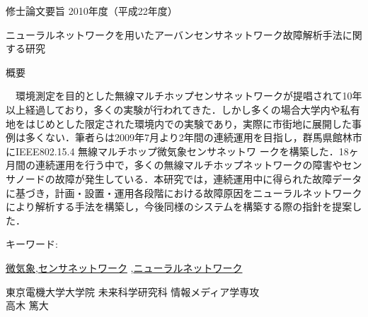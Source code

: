 \newpage
\pagestyle{plain}
\begin{center}
\LARGE{修士論文要旨 \hspace{10mm} 2010年度（平成22年度）}\\

\vspace{10mm}

\LARGE{ニューラルネットワークを用いたアーバンセンサネットワーク故障解析手法に関する研究}\\
\end{center}

\begin{center}
概要\\
\end{center}

　環境測定を目的とした無線マルチホップセンサネットワークが提唱されて10年以上経過しており，多くの実験が行われてきた．しかし多くの場合大学内や私有地をはじめとした限定された環境内での実験であり，実際に市街地に展開した事例は多くない．筆者らは2009年7月より2年間の連続運用を目指し，群馬県館林市にIEEE802.15.4 無線マルチホップ微気象センサネットワ ークを構築した．18ヶ月間の連続運用を行う中で，多くの無線マルチホップネットワークの障害やセンサノードの故障が発生している．本研究では，連続運用中に得られた故障データに基づき，計画・設置・運用各段階における故障原因をニューラルネットワークにより解析する手法を構築し，今後同様のシステムを構築する際の指針を提案した．

\begin{flushleft}キーワード:\\
\end{flushleft}
{\underline{微気象},\underline{センサネットワーク} ,\underline{ニューラルネットワーク} }


\begin{center}
\vspace{10mm}
\begin{flushright}\large 東京電機大学大学院 未来科学研究科 情報メディア学専攻\\
\LARGE 高木 篤大\\
\end{flushright}
\end{center}

\newpage

